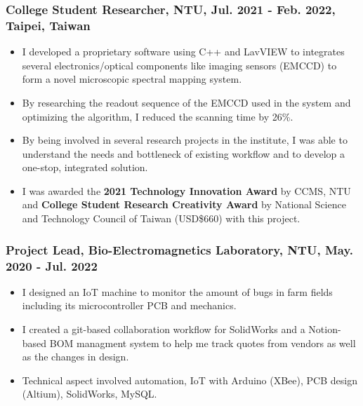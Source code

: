 \documentclass[12pt]{article}
\begin{document}
        \subsubsection*{College Student Researcher, NTU, Jul. 2021 - Feb. 2022, Taipei, Taiwan}
        {\sffamily
        \begin{itemize}
            \item I developed a proprietary software using C++ and LavVIEW to integrates several electronics/optical components like imaging sensors (EMCCD) to form a novel microscopic spectral mapping system. %
            \item By researching the readout sequence of the EMCCD used in the system and optimizing the algorithm, I reduced the scanning time by 26\%.
            \item By being involved in several research projects in the institute, I was able to understand the needs and bottleneck of existing workflow and to develop a one-stop, integrated solution.
            \item I was awarded the \textbf{2021 Technology Innovation Award} by CCMS, NTU and \textbf{College Student Research Creativity Award} by National Science and Technology Council of Taiwan (USD\$660) with this project.
        \end{itemize}}
        \subsubsection*{Project Lead, Bio-Electromagnetics Laboratory, NTU, May. 2020 - Jul. 2022}
        {\sffamily
        \begin{itemize}
            \item I designed an IoT machine to monitor the amount of bugs in farm fields including its microcontroller PCB and mechanics.
            \item I created a git-based collaboration workflow for SolidWorks and a Notion-based BOM managment system to help me track quotes from vendors as well as the changes in design.
            \item Technical aspect involved automation, IoT with Arduino (XBee), PCB design (Altium), SolidWorks, MySQL.
        \end{itemize}
        }
        
        
\end{document}
